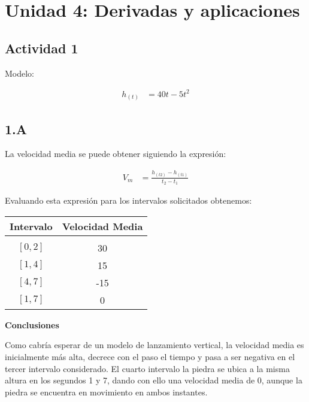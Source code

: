 \section*{Unidad 4: Derivadas y aplicaciones}
\subsection*{Actividad 1}

Modelo:

\begin{align*}
	h_{(t)} &= 40t - 5t^2
\end{align*}

\subsection*{1.A}

La velocidad media se puede obtener siguiendo la expresión:

\begin{align*}
	V_m &= \frac{h_{(t2)} - h_{(t1)}}{t_2 - t_1}
\end{align*}

Evaluando esta expresión para los intervalos solicitados obtenemos:

\begin{center}
\begin{tabular}{ c c }
	Intervalo	&	Velocidad Media \\
	\hline \\
	$[0, 2]$	&	30\\	
	$[1, 4]$	&	15\\
	$[4, 7]$	&	-15\\
	$[1, 7]$	&	0
\end{tabular}
\end{center}

\textbf{Conclusiones}

Como cabría esperar de un modelo de lanzamiento vertical, la velocidad media 
es inicialmente más alta, decrece con el paso el tiempo y 
pasa a ser negativa en el tercer intervalo considerado. 
El cuarto intervalo la piedra se ubica a la misma altura en los segundos 1 y 7,
dando con ello una velocidad media de 0, aunque la piedra se encuentra en 
movimiento en ambos instantes.


